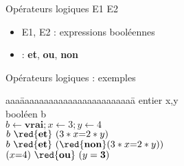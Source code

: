  \begin{frame}{Opérateurs logiques}
   E1 {} E2
   \begin{itemize}
   \item E1, E2 : expressions booléennes
   \item {} : \textbf{et}, \textbf{ou}, \textbf{non}
   \end{itemize}
 \end{frame}

 \begin{frame}{Opérateurs logiques : exemples}
   \begin{tabbing}
     aaa\=aaaaaaaaaaaaaaaaaaaaaaaa\=\kill
     \> entier x,y \\
     \> booléen b  \\
     \> $b \leftarrow \mathbf{vrai}; x \leftarrow 3; y \leftarrow 4$ \\
     \> $b ~{\red{\mathbf{et}}}~ (3*x \mathbf{=} 2*y )$ \> \\
     \>  $b ~{\red{\mathbf{et}}}~ ({\red{\mathbf{non}}}(3*x \mathbf{=} 2*y ))$      \> \\
     \> $(x \mathbf{=} 4) ~{\red{\mathbf{ou}}}~ (y=\mathbf{3})$ \> 
   \end{tabbing}
 \end{frame}

